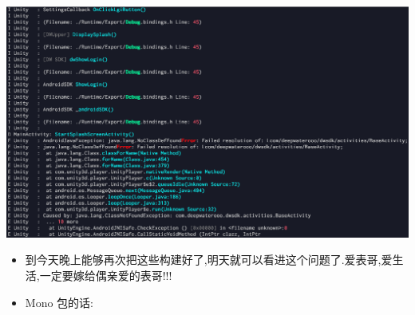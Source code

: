 \documentclass[9pt, b5paper]{article}
\begin{document}
\includegraphics[width=.9\linewidth]{./pic/readme_20221218_230256.png}
\begin{itemize}
\item 到今天晚上能够再次把这些构建好了,明天就可以看进这个问题了.爱表哥,爱生活,一定要嫁给偶亲爱的表哥!!!
\item Mono 包的话:
\end{itemize}
\end{document}
